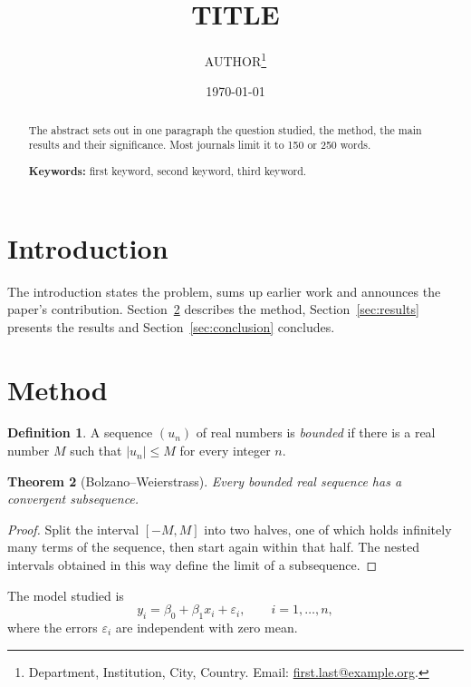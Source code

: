\documentclass[11pt]{article}
\title{{{TITLE}}}
\author{%
  {{AUTHOR}}\thanks{Department, Institution, City, Country.
    Email: \href{mailto:first.last@example.org}{first.last@example.org}.}%
}
\date{\today}
\newtheorem{theorem}{Theorem}
\theoremstyle{definition}
\newtheorem{definition}[theorem]{Definition}
\begin{document}
\maketitle

\begin{abstract}
The abstract sets out in one paragraph the question studied, the method, the
main results and their significance. Most journals limit it to 150 or 250
words.

\medskip
\noindent\textbf{Keywords:} first keyword, second keyword, third keyword.
\end{abstract}

\section{Introduction}
\label{sec:introduction}

The introduction states the problem, sums up earlier work
\parencite{knuth1981, lamport1994} and announces the paper's contribution.
Section~\ref{sec:method} describes the method, Section~\ref{sec:results}
presents the results and Section~\ref{sec:conclusion} concludes.

\section{Method}
\label{sec:method}

\begin{definition}
A sequence $(u_n)$ of real numbers is \emph{bounded} if there is a real
number $M$ such that $\lvert u_n \rvert \le M$ for every integer $n$.
\end{definition}

\begin{theorem}[Bolzano--Weierstrass]
\label{thm:bw}
Every bounded real sequence has a convergent subsequence.
\end{theorem}

\begin{proof}
Split the interval $[-M, M]$ into two halves, one of which holds infinitely
many terms of the sequence, then start again within that half. The nested
intervals obtained in this way define the limit of a subsequence.
\end{proof}

The model studied is
\begin{equation}
  \label{eq:model}
  y_i = \beta_0 + \beta_1 x_i + \varepsilon_i, \qquad i = 1, \dots, n,
\end{equation}
where the errors $\varepsilon_i$ are independent with zero mean.
\end{document}
